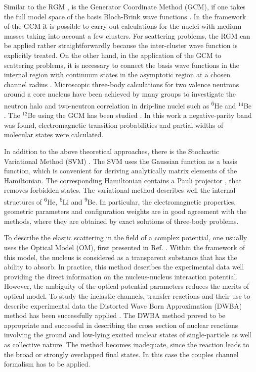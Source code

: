 \documentclass[
12pt, %
oneside, %
english, %
doublespacing, %
doublespacing, %
toctotoc, %
parskip, %
headsepline, %
]{MastersDoctoralThesis} %
\newcommand{\he}{\textsuperscript{6}He\xspace}
\newcommand{\li}{\textsuperscript{6}Li\xspace}
\newcommand{\be}{\textsuperscript{9}Be\xspace}
\begin{document}
Similar to the RGM \cite{horiuchi1970generator}, is the Generator Coordinate Method (GCM), if one takes the full model space of the basis Bloch-Brink wave functions \cite{brink1966proceedings}. 
In the framework of the GCM it is possible to carry out calculations for the nuclei with medium masses taking into account a few clusters. 
For scattering problems, the RGM can be applied rather straightforwardly because the inter-cluster wave function is explicitly treated. On the other hand, in the application of the GCM to scattering problems, it is necessary to connect the basis wave functions in the internal region with continuum states in the asymptotic region at a chosen channel radius \cite{descouvemont2010r}. 
 Microscopic three-body calculations for two valence neutrons around a core nucleus have been achieved by many groups to investigate the neutron halo and two-neutron correlation in drip-line nuclei such as \he and $^{14}$Be \cite{arai1999structure, descouvemont1995halo}. 
 The $^{12}$Be using the GCM has been studied \cite{descouvemont200112be}. 
 In this work a negative-parity band was found, electromagnetic transition probabilities and partial widths of molecular states were calculated.
 

In addition to the above theoretical approaches, there is the Stochastic Variational Method (SVM) \cite{kukulin1977stochastic, voronchev1994study, kukulin1986detailed, kukulin1984detailed}. 
The SVM uses the Gaussian function as a basis function, which is convenient for  deriving analytically matrix elements of the Hamiltonian. 
The corresponding Hamiltonian contains a Pauli projector \cite{kukulin1978orthogonal}, that removes forbidden states. 
The variational method describes well the internal structures of \he, \li and \be \cite{kukulin1984detailed, kukulin1986detailed, voronchev1994study}. 
In particular, the electromagnetic properties, geometric parameters and configuration weights are in good agreement with the methods, where they are obtained by exact solutions of three-body problems. 

To describe the elastic scattering in the field of a complex potential, one usually uses the Optical Model (OM), first presented in Ref. \cite{feshbach1958optical}. Within the framework of this model, the nucleus is considered as a transparent substance that has the ability to absorb. In practice, this method describes the experimental data well providing the direct information on the nucleus-nucleus interaction potential.
However, the ambiguity of the optical potential parameters reduces the merits of optical model.
To study the inelastic channels, transfer reactions and their use to describe experimental data the Distorted Wave Born Approximation (DWBA) method has been successfully applied \cite{satchler1960gamma}.
The DWBA method proved to be appropriate and successful in describing the cross section of nuclear reactions involving the ground and low-lying excited nuclear states of single-particle as well as collective nature.
The method becomes inadequate, since the reaction leads to the broad or strongly overlapped final states.
In this case the couples channel formalism has to be applied.
\end{document}
